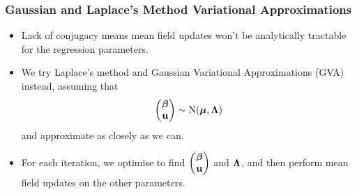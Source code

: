 \documentclass{beamer}
\begin{document}
\begin{frame}
	\frametitle{Gaussian and Laplace's Method Variational Approximations}
	\begin{itemize}
		\item Lack of conjugacy means mean field updates won't be analytically tractable for the regression parameters.
		\item We try Laplace's method and Gaussian Variational Approximations (GVA) instead, assuming that
		      $$
		      \begin{pmatrix}
		      	{\boldsymbol\beta} \\
		      	{\bf u}    
		      \end{pmatrix}
		      \sim \text{N}({\boldsymbol \mu}, {\boldsymbol \Lambda})
		      $$
		      and approximate as closely as we can.
		\item For each iteration, we optimise to find
		      $\begin{pmatrix}
		      	{\boldsymbol\beta} \\
		      	{\bf u}    
		      \end{pmatrix}
		      $ and ${\boldsymbol \Lambda}$,
		      and then perform mean field updates on the other parameters.
	\end{itemize}
\end{frame}

\end{document}
